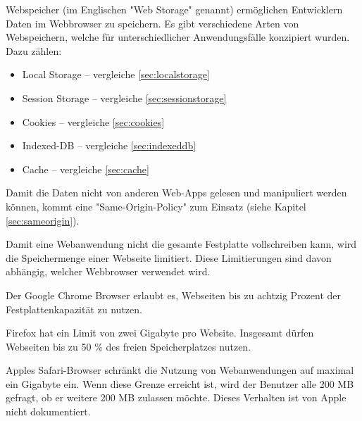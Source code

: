 \label{sec:webstorage}


Webspeicher (im Englischen "Web Storage" genannt) ermöglichen Entwicklern %
Daten im Webbrowser zu speichern.
Es gibt verschiedene Arten von Webspeichern, welche für unterschiedlicher Anwendungsfälle konzipiert wurden. Dazu zählen:

\begin{itemize}
    \item Local Storage -- vergleiche \ref{sec:localstorage}
    \item Session Storage -- vergleiche \ref{sec:sessionstorage}
    \item Cookies -- vergleiche \ref{sec:cookies}
    \item Indexed-DB -- vergleiche \ref{sec:indexeddb}
    \item Cache -- vergleiche \ref{sec:cache}
\end{itemize}

Damit die Daten nicht von anderen Web-Apps gelesen und manipuliert werden können, kommt eine  "Same-Origin-Policy" zum Einsatz (siehe Kapitel \ref{sec:sameorigin}).


Damit eine Webanwendung nicht die gesamte Festplatte vollschreiben kann, wird die Speichermenge einer Webseite limitiert. Diese Limitierungen sind davon abhängig, welcher Webbrowser verwendet wird. \cite{WebDevStorage}

Der Google Chrome Browser erlaubt es, Webseiten bis zu achtzig Prozent der Fest\-platten\-kapazität zu nutzen. 

Firefox hat ein Limit von zwei Gigabyte pro Website. Insgesamt dürfen Webseiten bis zu 50 \% des freien Speicherplatzes nutzen. 

Apples Safari-Browser schränkt die Nutzung von Webanwendungen auf maximal ein Gigabyte ein. 
Wenn diese Grenze erreicht ist, wird der Benutzer alle 200 MB gefragt, ob er weitere 200 MB zulassen möchte. 
Dieses Verhalten ist von Apple nicht dokumentiert. 

 \label{sec:sameorigin}

